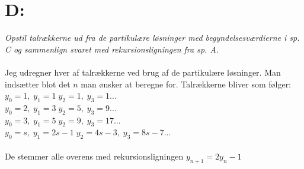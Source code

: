 \documentclass[a4paper, 11pt]{article}
\begin{document}
\section*{D:}
\textit{Opstil talrækkerne ud fra de partikulære løsninger med begyndelsesværdierne i sp. C og sammenlign svaret med rekursionsligningen fra sp. A.}\\\\
Jeg udregner hver af talrækkerne ved brug af de partikulære løsninger. Man indsætter blot det \(n\) man ønsker at beregne for.
Talrækkerne bliver som følger:\\
\(y_0=1,\; y_1=1\; y_2=1,\; y_3=1 \dots\)\\
\(y_0=2,\; y_1=3\; y_2=5,\; y_3=9 \dots\)\\
\(y_0=3,\; y_1=5\; y_2=9,\; y_3=17 \dots\)\\
\(y_0=s,\; y_1=2s-1\; y_2=4s-3,\; y_3=8s-7 \dots\)\\\\
De stemmer alle overens med rekursionsligningen \(y_{n+1}=2y_n-1\)
\end{document}
